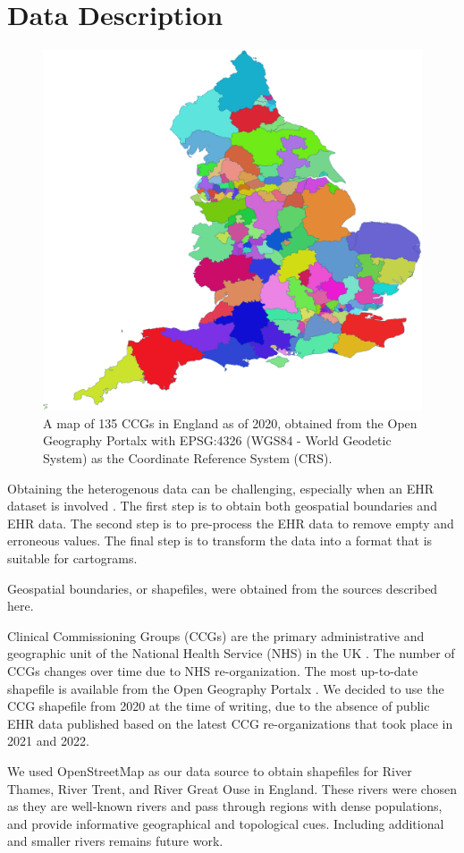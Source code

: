 \section{Data Description}

{
\begin{figure}[htb!]
    \centering
    \includegraphics[width=0.6\columnwidth]{figure/ccg.png}
    \caption{A map of 135 CCGs in England as of 2020, obtained from the Open Geography Portalx \cite{opengeographyportalxOpen} with EPSG:4326 (WGS84 - World Geodetic System) as the Coordinate Reference System (CRS).}
    \label{fig:ccg}
\end{figure}
}

Obtaining the heterogenous data can be challenging, especially when an EHR dataset is involved \cite{wang2021EHRa}. The first step is to obtain both geospatial boundaries and EHR data. The second step is to pre-process the EHR data to remove empty and erroneous values. The final step is to transform the data into a format that is suitable for cartograms.

Geospatial boundaries, or shapefiles, were obtained from the sources described here.

 Clinical Commissioning Groups (CCGs) are the primary administrative and geographic unit of the National Health Service (NHS) in the UK \cite{nhsNHS}. The number of CCGs changes over time due to NHS re-organization. The most up-to-date shapefile is available from the Open Geography Portalx \cite{opengeographyportalxOpen}. We decided to use the CCG shapefile from 2020 at the time of writing, due to the absence of public EHR data published based on the latest CCG re-organizations that took place in 2021 and 2022.

 We used OpenStreetMap \cite{openstreetmapRelation} as our data source to obtain shapefiles for River Thames, River Trent, and River Great Ouse in England. These rivers were chosen as they are well-known rivers and pass through regions with dense populations, and provide informative geographical and topological cues. Including additional and smaller rivers remains future work.

